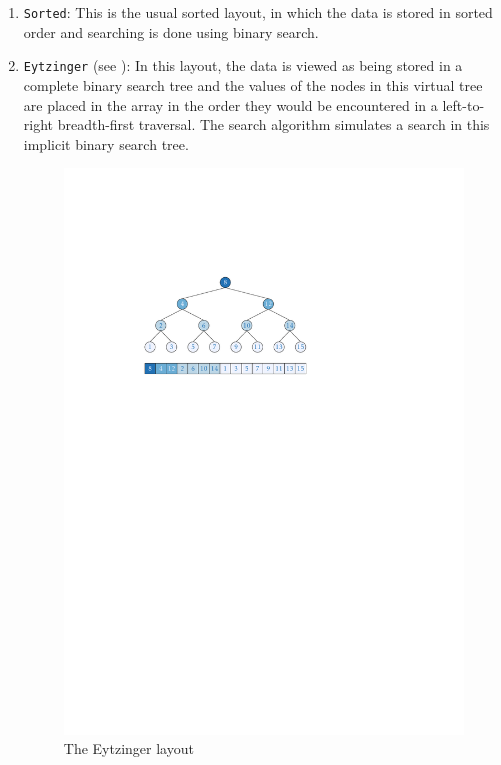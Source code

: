 \documentclass{patmorin}
\begin{document}
\begin{enumerate}
  \item \texttt{Sorted}:  This is the usual sorted layout, in which
  the data is stored in sorted order and searching is done using binary
  search.

  \item \texttt{Eytzinger} (see ): In this layout,
  the data is viewed as being stored in a complete binary search tree and
  the values of the nodes in this virtual tree are placed in the array in
  the order they would be encountered in a left-to-right breadth-first
  traversal.  The search algorithm simulates a search in this implicit
  binary search tree.

  \begin{figure}
    \begin{center}\includegraphics{eytzinger}\end{center}
    \caption{The Eytzinger layout}
  \end{figure}


\end{enumerate}
\end{document}
